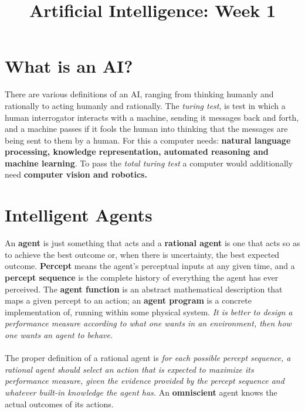 \documentclass[twoside]{article}
\title{Artificial Intelligence: Week 1}
\date{}
\author{}
\begin{document}
\maketitle
\section{What is an AI?}
There are various definitions of an AI, ranging from thinking humanly and
rationally to acting humanly and rationally. The \emph{turing test}, is test
in which a human interrogator interacts with a machine, sending it messages
back and forth, and a machine passes if it fools the human into thinking that
the messages are being sent to them by a human. For this a computer needs:
\textbf{natural language processing, knowledge representation, automated
reasoning and machine learning}. To pass the \emph{total turing test} a computer
would additionally need \textbf{computer vision and robotics.}
\section{Intelligent Agents}
An \textbf{agent} is just something that acts and a \textbf{rational agent} is
one that acts so as to achieve the best outcome or, when there is uncertainty,
the best expected outcome. \textbf{Percept} means the agent's perceptual inputs
at any given time, and a \textbf{percept sequence} is the complete history of
everything the agent has ever perceived. The \textbf{agent function} is an
abstract mathematical description that maps a given percept to an action; an
\textbf{agent program} is a concrete implementation of, running within some
physical system. \emph{It is better to design a performance measure according
to what one wants in an environment, then how one wants an agent to behave.}
\\ \\
The proper definition of a rational agent is \emph{for each possible percept
sequence, a rational agent should select an action that is expected to
maximize its performance measure, given the evidence provided by the percept
sequence and whatever built-in knowledge the agent has.} An \textbf{omniscient}
agent knows the actual outcomes of its actions.
\end{document}
